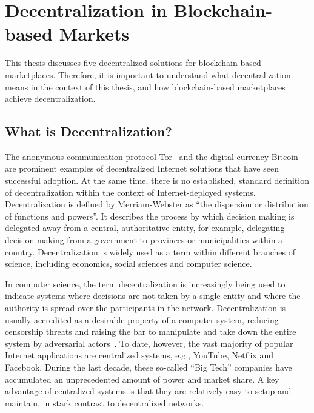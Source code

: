 \section{Decentralization in Blockchain-based Markets}
\label{sec:decentralization}
This thesis discusses five decentralized solutions for blockchain-based marketplaces.
Therefore, it is important to understand what decentralization means in the context of this thesis, and how blockchain-based marketplaces achieve decentralization.

\subsection{What is Decentralization?}
The anonymous communication protocol Tor~\cite{syverson2004tor} and the digital currency Bitcoin~\cite{nakamoto2008bitcoin} are prominent examples of decentralized Internet solutions that have seen successful adoption.
At the same time, there is no established, standard definition of decentralization within the context of Internet-deployed systems.
Decentralization is defined by Merriam-Webster as \enquote{the dispersion or distribution of functions and powers}.
It describes the process by which decision making is delegated away from a central, authoritative entity, for example, delegating decision making from a government to provinces or municipalities within a country.
Decentralization is widely used as a term within different branches of science, including economics, social sciences and computer science.

In computer science, the term decentralization is increasingly being used to indicate systems where decisions are not taken by a single entity and where the authority is spread over the participants in the network.
Decentralization is usually accredited as a desirable property of a computer system, reducing censorship threats and raising the bar to manipulate and take down the entire system by adversarial actors~\cite{troncoso2017systematizing}.
To date, however, the vast majority of popular Internet applications are centralized systems, e.g., YouTube, Netflix and Facebook.
During the last decade, these so-called \enquote{Big Tech} companies have accumulated an unprecedented amount of power and market share.
A key advantage of centralized systems is that they are relatively easy to setup and maintain, in stark contrast to decentralized networks.

